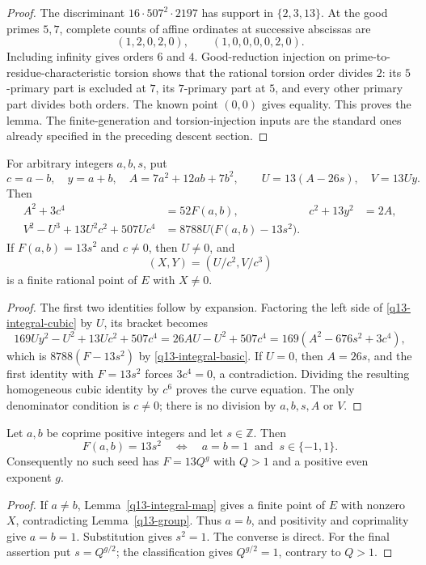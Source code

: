\begin{proof}
The discriminant $16\cdot507^2\cdot2197$ has support in $\{2,3,13\}$.
At the good primes $5,7$, complete counts of affine ordinates at
successive abscissas are
\[
 (1,2,0,2,0),\qquad (1,0,0,0,0,2,0).
\]
Including infinity gives orders $6$ and $4$. Good-reduction injection
on prime-to-residue-characteristic torsion shows that the rational
torsion order divides $2$: its $5$-primary part is excluded at $7$,
its $7$-primary part at $5$, and every other primary part divides both
orders. The known point $(0,0)$ gives equality. This proves the lemma.
The finite-generation and torsion-injection inputs are the standard
ones already specified in the preceding descent section.
\end{proof}

\begin{lemma}\label{q13-integral-map}
For arbitrary integers $a,b,s$, put
\[
 c=a-b,\quad y=a+b,\quad A=7a^2+12ab+7b^2,
 \qquad U=13(A-26s),\quad V=13Uy.
\]
Then
\begin{align}
 A^2+3c^4&=52F(a,b),&c^2+13y^2&=2A,\label{q13-integral-basic}\\
 V^2-U^3+13U^2c^2+507Uc^4
   &=8788U\bigl(F(a,b)-13s^2\bigr).\label{q13-integral-cubic}
\end{align}
If $F(a,b)=13s^2$ and $c\ne0$, then $U\ne0$, and
\[
 (X,Y)=(U/c^2,V/c^3)
\]
is a finite rational point of $E$ with $X\ne0$.
\end{lemma}
\begin{proof}
The first two identities follow by expansion. Factoring the left side
of \eqref{q13-integral-cubic} by $U$, its bracket becomes
\[
 169Uy^2-U^2+13Uc^2+507c^4
 =26AU-U^2+507c^4
 =169(A^2-676s^2+3c^4),
\]
which is $8788(F-13s^2)$ by \eqref{q13-integral-basic}.
If $U=0$, then $A=26s$, and the first identity with $F=13s^2$
forces $3c^4=0$, a contradiction. Dividing the resulting homogeneous
cubic identity by $c^6$ proves the curve equation. The only denominator
condition is $c\ne0$; there is no division by $a,b,s,A$ or $V$.
\end{proof}

\begin{theorem}\label{q13-classification}
Let $a,b$ be coprime positive integers and let $s\in\mathbb Z$.
Then
\[
 F(a,b)=13s^2
 \quad\Longleftrightarrow\quad
 a=b=1\ \text{ and }\ s\in\{-1,1\}.
\]
Consequently no such seed has $F=13Q^g$ with $Q>1$ and a positive
even exponent $g$.
\end{theorem}
\begin{proof}
If $a\ne b$, Lemma~\ref{q13-integral-map} gives a finite point of
$E$ with nonzero $X$, contradicting Lemma~\ref{q13-group}.
Thus $a=b$, and positivity and coprimality give $a=b=1$.
Substitution gives $s^2=1$. The converse is direct. For the final
assertion put $s=Q^{g/2}$; the classification gives $Q^{g/2}=1$,
contrary to $Q>1$.
\end{proof}

